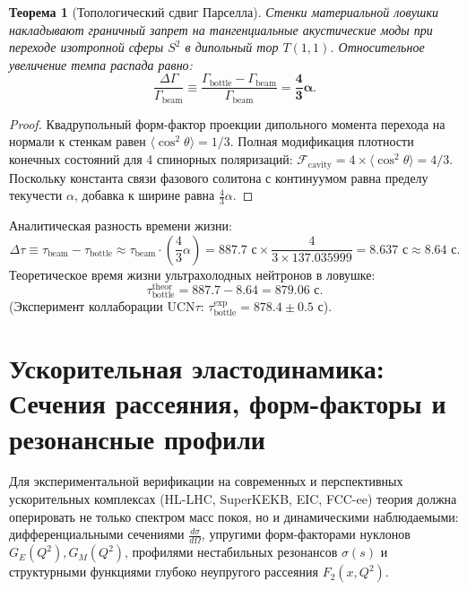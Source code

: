 \documentclass[12pt,a4paper]{article}
\newtheorem{theorem}{Теорема}
\begin{document}
	\begin{theorem}[Топологический сдвиг Парселла]
		Стенки материальной ловушки накладывают граничный запрет на тангенциальные акустические моды при переходе изотропной сферы $S^2$ в дипольный тор $T(1,1)$. Относительное увеличение темпа распада равно:
		\begin{equation}
			\frac{\Delta \Gamma}{\Gamma_{\mathrm{beam}}} \equiv \frac{\Gamma_{\mathrm{bottle}} - \Gamma_{\mathrm{beam}}}{\Gamma_{\mathrm{beam}}} = \mathbf{\frac{4}{3} \alpha}.
		\end{equation}
	\end{theorem}
	
	\begin{proof}
		Квадрупольный форм-фактор проекции дипольного момента перехода на нормали к стенкам равен $\langle \cos^2\theta \rangle = 1/3$. Полная модификация плотности конечных состояний для 4 спинорных поляризаций: $\mathcal{F}_{\text{cavity}} = 4 \times \langle \cos^2\theta \rangle = 4/3$. Поскольку константа связи фазового солитона с континуумом равна пределу текучести $\alpha$, добавка к ширине равна $\frac{4}{3}\alpha$.
	\end{proof}
	
	Аналитическая разность времени жизни:
	\begin{equation}
		\Delta \tau \equiv \tau_{\text{beam}} - \tau_{\text{bottle}} \approx \tau_{\text{beam}} \cdot \left( \frac{4}{3} \alpha \right) = 887.7 \text{ с} \times \frac{4}{3 \times 137.035999} = \mathbf{8.637 \text{ с}} \approx \mathbf{8.64 \text{ с}}.
	\end{equation}
	Теоретическое время жизни ультрахолодных нейтронов в ловушке:
	\begin{equation}
		\tau_{\text{bottle}}^{\text{theor}} = 887.7 - 8.64 = \mathbf{879.06 \text{ с}}.
	\end{equation}
	(Эксперимент коллаборации $\text{UCN}\tau$: $\tau_{\text{bottle}}^{\text{exp}} = \mathbf{878.4 \pm 0.5 \text{ с}}$).
	
	\section{Ускорительная эластодинамика: Сечения рассеяния, форм-факторы и резонансные профили}
	
	Для экспериментальной верификации на современных и перспективных ускорительных комплексах (HL-LHC, SuperKEKB, EIC, FCC-ee) теория должна оперировать не только спектром масс покоя, но и динамическими наблюдаемыми: дифференциальными сечениями $\frac{d\sigma}{d\Omega}$, упругими форм-факторами нуклонов $G_E(Q^2), G_M(Q^2)$, профилями нестабильных резонансов $\sigma(s)$ и структурными функциями глубоко неупругого рассеяния $F_2(x, Q^2)$.
	
\end{document}
